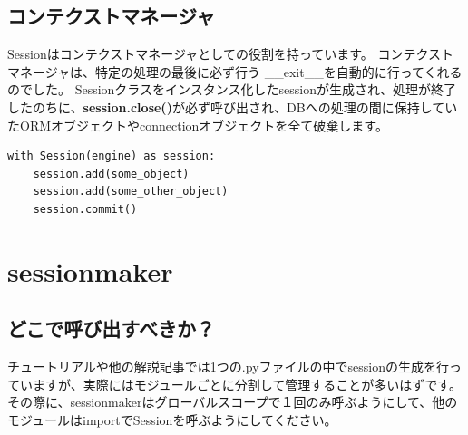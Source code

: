 \subsection{コンテクストマネージャ}
Sessionはコンテクストマネージャとしての役割を持っています。
コンテクストマネージャは、特定の処理の最後に必ず行う \_\_exit\_\_を自動的に行ってくれるのでした。
Sessionクラスをインスタンス化したsessionが生成され、処理が終了したのちに、\textbf{session.close()}が必ず呼び出され、DBへの処理の間に保持していたORMオブジェクトやconnectionオブジェクトを全て破棄します。

\begin{lstlisting}[caption={コンテクストマネージャ}]
  with Session(engine) as session:
    session.add(some_object)
    session.add(some_other_object)
    session.commit()
\end{lstlisting}


\section{sessionmaker}

\subsection{どこで呼び出すべきか？}
チュートリアルや他の解説記事では1つの.pyファイルの中でsessionの生成を行っていますが、実際にはモジュールごとに分割して管理することが多いはずです。
その際に、sessionmakerはグローバルスコープで１回のみ呼ぶようにして、他のモジュールはimportでSessionを呼ぶようにしてください。
